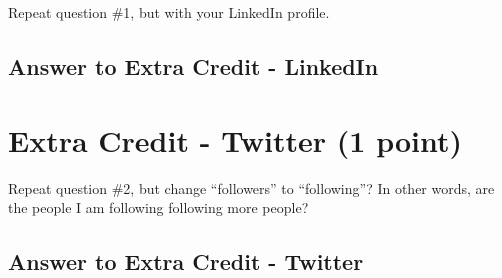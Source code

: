 \documentclass{article}
\begin{document}
Repeat question \#1, but with your LinkedIn profile.

\subsection*{Answer to Extra Credit - LinkedIn}

\clearpage

\section*{Extra Credit - Twitter (1 point)}

Repeat question \#2, but change ``followers'' to ``following''? In other words, are the people I am following following more people?

\subsection*{Answer to Extra Credit - Twitter}
\end{document}
